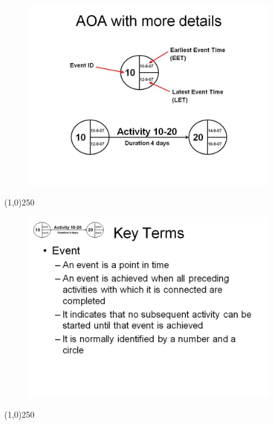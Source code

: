 \begin{frame}
\begin{figure}
	\centering
		\includegraphics[width = 10.5cm]{oldnotes/Slide54.jpg}
\end{figure}
\end{frame}
\begin{center}\line(1,0){250}\end{center}





\begin{frame}
\begin{figure}
	\centering
		\includegraphics[width = 10.5cm]{oldnotes/Slide55.jpg}
\end{figure}
\end{frame}
\begin{center}\line(1,0){250}\end{center}





